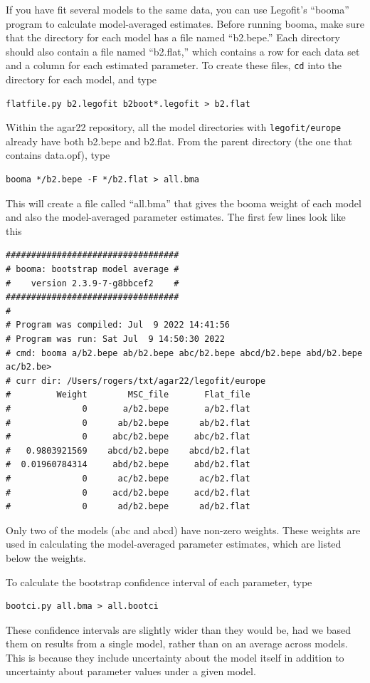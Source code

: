 \documentclass[11pt]{article}
\begin{document}
If you have fit several models to the same data, you can use Legofit's
``booma'' program to calculate model-averaged estimates. Before
running booma, make sure that the directory for each model has a file
named ``b2.bepe.'' Each directory should also contain a file named
``b2.flat,'' which contains a row for each data set and a column for
each estimated parameter. To create these files, \texttt{cd} into the
directory for each model, and type
\begin{verbatim}
flatfile.py b2.legofit b2boot*.legofit > b2.flat
\end{verbatim}
Within the agar22 repository, all the model directories with
\texttt{legofit/europe} already have both b2.bepe and b2.flat. From
the parent directory (the one that contains data.opf), type
\begin{verbatim}
booma */b2.bepe -F */b2.flat > all.bma
\end{verbatim}
This will create a file called ``all.bma'' that gives the booma weight
of each model and also the model-averaged parameter estimates. The
first few lines look like this
\begin{verbatim}
##################################
# booma: bootstrap model average #
#    version 2.3.9-7-g8bbcef2    #
##################################
#
# Program was compiled: Jul  9 2022 14:41:56
# Program was run: Sat Jul  9 14:50:30 2022
# cmd: booma a/b2.bepe ab/b2.bepe abc/b2.bepe abcd/b2.bepe abd/b2.bepe ac/b2.be>
# curr dir: /Users/rogers/txt/agar22/legofit/europe
#         Weight        MSC_file       Flat_file
#              0       a/b2.bepe       a/b2.flat
#              0      ab/b2.bepe      ab/b2.flat
#              0     abc/b2.bepe     abc/b2.flat
#   0.9803921569    abcd/b2.bepe    abcd/b2.flat
#  0.01960784314     abd/b2.bepe     abd/b2.flat
#              0      ac/b2.bepe      ac/b2.flat
#              0     acd/b2.bepe     acd/b2.flat
#              0      ad/b2.bepe      ad/b2.flat
\end{verbatim}
Only two of the models (abc and abcd) have non-zero weights.  These
weights are used in calculating the model-averaged parameter
estimates, which are listed below the weights.

To calculate the bootstrap confidence interval of each parameter, type
\begin{verbatim}
bootci.py all.bma > all.bootci
\end{verbatim}
These confidence intervals are slightly wider than they would be, had
we based them on results from a single model, rather than on an
average across models. This is because they include uncertainty about
the model itself in addition to uncertainty about parameter values
under a given model.
\end{document}
